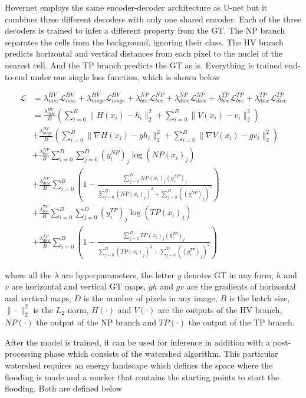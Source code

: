 Hovernet employs the same encoder-decoder architecture as U-net but it combines three different decoders with only one shared encoder. Each of the three decoders is trained to infer a different property from the GT. The NP branch separates the cells from the background, ignoring their class. The HV branch predicts horizontal and vertical distances from each pixel to the nuclei of the nearest cell. And the TP branch predicts the GT as is. Everything is trained end-to-end under one single loss function, which is shown below

\begin{align}
    \mathcal{L} &= \lambda_{mse}^{HV}\mathcal{L}_{mse}^{HV} + \lambda_{msge}^{HV}\mathcal{L}_{msge}^{HV} + \lambda_{bce}^{NP}\mathcal{L}_{bce}^{NP} + \lambda_{dice}^{NP}\mathcal{L}_{dice}^{NP} + \lambda_{bce}^{TP}\mathcal{L}_{bce}^{TP} + \lambda_{dice}^{TP}\mathcal{L}_{dice}^{TP} \\
    &= \frac{\lambda_{mse}^{HV}}{B}\left( \sum_{i=0}^{B} \| H(x_i) - h_i \|_2^2 + \sum_{i=0}^{B} \| V(x_i) - v_i \|_2^2 \right) \\
    &+ \frac{\lambda_{msge}^{HV}}{B}\left( \sum_{i=0}^{B} \| \nabla H(x_i) - gh_i \|_2^2 + \sum_{i=0}^{B} \| \nabla V(x_i) - gv_i \|_2^2 \right) \\
    &+ \frac{\lambda_{bce}^{NP}}{B} \sum_{i=0}^B \sum_{j=0}^{D} (y_{i}^{NP})_j \log (NP(x_i)_j) \\
    &+ \frac{\lambda_{dice}^{NP}}{B} \sum_{i=0}^B \left(1 - \frac{\sum_{j=0}^D NP(x_i)_j (y_{i}^{NP})_j}{\sum_{j=0}^D (NP(x_i)_j)^2 + \sum_{j=0}^D ((y_{i}^{NP})_j)^2}\right)\\
    &+ \frac{\lambda_{bce}^{TP}}{B} \sum_{i=0}^B \sum_{j=0}^{D} (y_{i}^{TP})_j \log (TP(x_i)_j) \\
    &+ \frac{\lambda_{dice}^{TP}}{B} \sum_{i=0}^B \left(1 - \frac{\sum_{j=0}^D TP(x_i)_j (y_{i}^{TP})_j}{\sum_{j=0}^D (TP(x_i)_j)^2 + \sum_{j=0}^D ((y_{i}^{TP})_j)^2}\right)
\end{align}

\noindent where all the $\lambda$ are hyperparameters, the letter $y$ denotes GT in any form, $h$ and $v$ are horizontal and vertical GT maps, $gh$ and $gv$ are the gradients of horizontal and vertical maps, $D$ is the number of pixels in any image, $B$ is the batch size, $\| \cdot \|_2^2$ is the $L_2$ norm, $H(\cdot)$ and $V(\cdot)$ are the outputs of the HV branch, $NP(\cdot)$ the output of the NP branch and $TP(\cdot)$ the output of the TP branch.

After the model is trained, it can be used for inference in addition with a post-processing phase which consists of the watershed algorithm. This particular watershed requires an energy landscape which defines the space where the flooding is made and a marker that contains the starting points to start the flooding. Both are defined below

